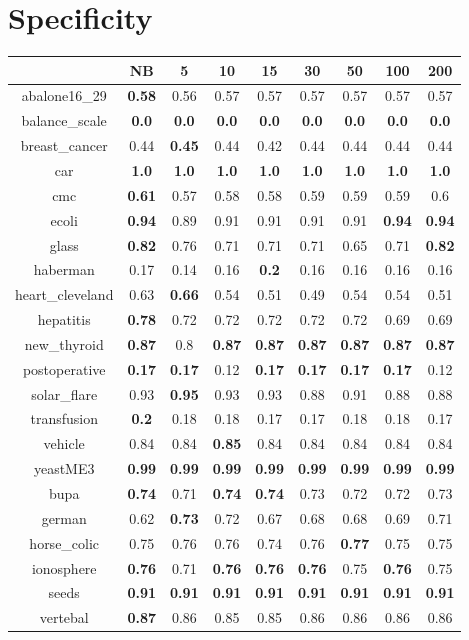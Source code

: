 \documentclass{article}%
\begin{document}
%
\section*{Specificity}%
\begin{tabular}{c|cccccccc}%
\hline%
&NB&5&10&15&30&50&100&200\\%
\hline%
abalone16\_29&\textbf{0.58}&0.56&0.57&0.57&0.57&0.57&0.57&0.57\\%
\hline%
balance\_scale&\textbf{0.0}&\textbf{0.0}&\textbf{0.0}&\textbf{0.0}&\textbf{0.0}&\textbf{0.0}&\textbf{0.0}&\textbf{0.0}\\%
\hline%
breast\_cancer&0.44&\textbf{0.45}&0.44&0.42&0.44&0.44&0.44&0.44\\%
\hline%
car&\textbf{1.0}&\textbf{1.0}&\textbf{1.0}&\textbf{1.0}&\textbf{1.0}&\textbf{1.0}&\textbf{1.0}&\textbf{1.0}\\%
\hline%
cmc&\textbf{0.61}&0.57&0.58&0.58&0.59&0.59&0.59&0.6\\%
\hline%
ecoli&\textbf{0.94}&0.89&0.91&0.91&0.91&0.91&\textbf{0.94}&\textbf{0.94}\\%
\hline%
glass&\textbf{0.82}&0.76&0.71&0.71&0.71&0.65&0.71&\textbf{0.82}\\%
\hline%
haberman&0.17&0.14&0.16&\textbf{0.2}&0.16&0.16&0.16&0.16\\%
\hline%
heart\_cleveland&0.63&\textbf{0.66}&0.54&0.51&0.49&0.54&0.54&0.51\\%
\hline%
hepatitis&\textbf{0.78}&0.72&0.72&0.72&0.72&0.72&0.69&0.69\\%
\hline%
new\_thyroid&\textbf{0.87}&0.8&\textbf{0.87}&\textbf{0.87}&\textbf{0.87}&\textbf{0.87}&\textbf{0.87}&\textbf{0.87}\\%
\hline%
postoperative&\textbf{0.17}&\textbf{0.17}&0.12&\textbf{0.17}&\textbf{0.17}&\textbf{0.17}&\textbf{0.17}&0.12\\%
\hline%
solar\_flare&0.93&\textbf{0.95}&0.93&0.93&0.88&0.91&0.88&0.88\\%
\hline%
transfusion&\textbf{0.2}&0.18&0.18&0.17&0.17&0.18&0.18&0.17\\%
\hline%
vehicle&0.84&0.84&\textbf{0.85}&0.84&0.84&0.84&0.84&0.84\\%
\hline%
yeastME3&\textbf{0.99}&\textbf{0.99}&\textbf{0.99}&\textbf{0.99}&\textbf{0.99}&\textbf{0.99}&\textbf{0.99}&\textbf{0.99}\\%
\hline%
bupa&\textbf{0.74}&0.71&\textbf{0.74}&\textbf{0.74}&0.73&0.72&0.72&0.73\\%
\hline%
german&0.62&\textbf{0.73}&0.72&0.67&0.68&0.68&0.69&0.71\\%
\hline%
horse\_colic&0.75&0.76&0.76&0.74&0.76&\textbf{0.77}&0.75&0.75\\%
\hline%
ionosphere&\textbf{0.76}&0.71&\textbf{0.76}&\textbf{0.76}&\textbf{0.76}&0.75&\textbf{0.76}&0.75\\%
\hline%
seeds&\textbf{0.91}&\textbf{0.91}&\textbf{0.91}&\textbf{0.91}&\textbf{0.91}&\textbf{0.91}&\textbf{0.91}&\textbf{0.91}\\%
\hline%
vertebal&\textbf{0.87}&0.86&0.85&0.85&0.86&0.86&0.86&0.86\\%
\hline%
\end{tabular}
\end{document}
